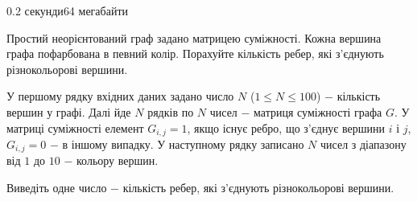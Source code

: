 \begin{problem}{}{}{}{0.2 секунди}{64 мегабайти}

Простий неорієнтований граф задано матрицею суміжності. Кожна вершина графа пофарбована в певний колір.
Порахуйте кількість ребер, які з'єднують різнокольорові вершини.

\InputFile
У першому рядку вхідних даних задано число $N$ ($1 \le N \le 100$) $-$ кількість вершин у графі.
Далі йде $N$ рядків по $N$ чисел $-$ матриця суміжності графа $G$.
У матриці суміжності елемент $G_{i,j}=1$, якщо існує ребро, що з'єднує вершини $i$ і $j$, $G_{i,j}=0$ $-$ в іншому випадку.
У наступному рядку записано $N$ чисел з діапазону від $1$ до $10$ $-$ кольору вершин.

\OutputFile
Виведіть одне число $-$ кількість ребер, які з'єднують різнокольорові вершини.

\Example

\begin{example}
\end{example}

\end{problem}
